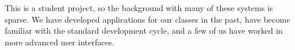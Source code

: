 This is a student project, so the background with many of these systems is sparse. We have developed applications for our classes in the past, have become familiar with the standard development cycle, and a few of us have worked in more advanced user interfaces.

